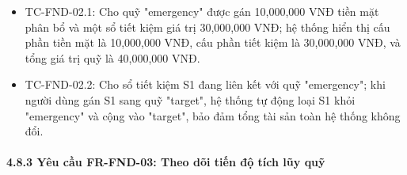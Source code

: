 \documentclass[11pt,a4paper]{article}
\providecommand{\tightlist}{
  \setlength{\itemsep}{0pt}\setlength{\parskip}{0pt}}
\begin{document}
\begin{itemize}
  \begin{itemize}
  \tightlist
  \item
    TC-FND-02.1: Cho quỹ "emergency" được gán 10,000,000 VNĐ tiền mặt
    phân bổ và một sổ tiết kiệm giá trị 30,000,000 VNĐ; hệ thống hiển
    thị cấu phần tiền mặt là 10,000,000 VNĐ, cấu phần tiết kiệm là
    30,000,000 VNĐ, và tổng giá trị quỹ là 40,000,000 VNĐ.
  \item
    TC-FND-02.2: Cho sổ tiết kiệm S1 đang liên kết với quỹ "emergency";
    khi người dùng gán S1 sang quỹ "target", hệ thống tự động loại S1
    khỏi "emergency" và cộng vào "target", bảo đảm tổng tài sản toàn hệ
    thống không đổi.
  \end{itemize}
\end{itemize}

\paragraph{4.8.3 Yêu cầu FR-FND-03: Theo dõi tiến độ tích lũy
quỹ}\label{483-yuxeau-cux1ea7u-fr-fnd-03-theo-duxf5i-tiux1ebfn-ux111ux1ed9-tuxedch-lux169y-quux1ef9}
\end{document}
